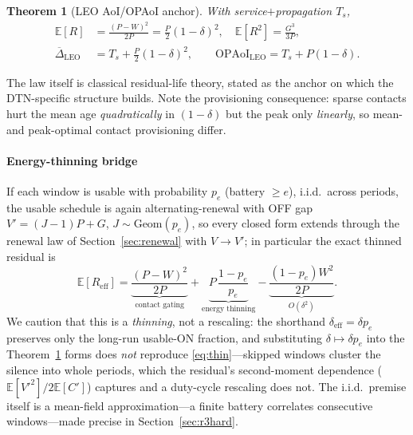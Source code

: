 \documentclass[twocolumn,3p,times,procedia]{elsarticle}
\newtheorem{theorem}{Theorem}
\newcommand{\AoI}{\Delta}
\newcommand{\OPAoI}{\mathrm{OPAoI}}
\newcommand{\E}{\mathbb{E}}
\newcommand{\dutyeff}{\delta_{\mathrm{eff}}}
\newcommand{\peff}{p_e}
\begin{document}
\begin{theorem}[LEO AoI/OPAoI anchor]\label{thm:r1}
With service$+$propagation $T_s$,
\begin{align}
\E[R]&=\frac{(P-W)^2}{2P}=\tfrac{P}{2}(1-\delta)^2,\quad
\E[R^2]=\frac{G^3}{3P},\\
\overline{\AoI}_{\mathrm{LEO}}&=T_s+\tfrac{P}{2}(1-\delta)^2,\qquad
\OPAoI_{\mathrm{LEO}}=T_s+P(1-\delta).
\end{align}
\end{theorem}
The law itself is classical residual-life theory, stated as the anchor
on which the DTN-specific structure builds. Note the provisioning
consequence: sparse contacts hurt the mean age \emph{quadratically} in
$(1-\delta)$ but the peak only \emph{linearly}, so mean- and
peak-optimal contact provisioning differ.

\paragraph*{Energy-thinning bridge}
If each window is usable with probability $\peff$ (battery $\ge e$),
i.i.d.\ across periods, the usable schedule is again alternating-renewal
with OFF gap $V'=(J{-}1)P+G$, $J\sim\mathrm{Geom}(\peff)$, so every
closed form extends through the renewal law of
Section~\ref{sec:renewal} with $V\to V'$; in particular the exact
thinned residual is
\begin{equation}\label{eq:thin}
\E[R_{\mathrm{eff}}]=
\underbrace{\frac{(P-W)^2}{2P}}_{\text{contact gating}}
+\underbrace{P\,\frac{1-\peff}{\peff}}_{\text{energy thinning}}
-\underbrace{\frac{(1-\peff)W^2}{2P}}_{O(\delta^2)} .
\end{equation}
We caution that this is a \emph{thinning}, not a rescaling: the
shorthand $\dutyeff=\delta\peff$ preserves only the long-run usable-ON
fraction, and substituting $\delta\mapsto\delta\peff$ into the
Theorem~\ref{thm:r1} forms does \emph{not} reproduce
\eqref{eq:thin}---skipped windows cluster the silence into whole
periods, which the residual's second-moment dependence
($\E[V'^2]/2\E[C']$) captures and a duty-cycle rescaling does not. The
i.i.d.\ premise itself is a mean-field approximation---a finite battery
correlates consecutive windows---made precise in
Section~\ref{sec:r3hard}.

\end{document}
